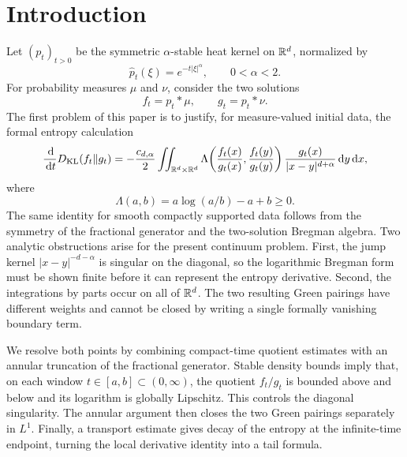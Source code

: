 \section{Introduction}\label{sec:introduction}

Let \((p_t)_{t>0}\) be the symmetric \(\alpha\)-stable heat kernel on
\(\mathbb{R}^d\), normalized by
\[
 \widehat p_t(\xi)=e^{-t|\xi|^\alpha},\qquad 0<\alpha<2.
\]
For probability measures \(\mu\) and \(\nu\), consider the two solutions
\[
 f_t=p_t*\mu,\qquad g_t=p_t*\nu.
\]
The first problem of this paper is to justify, for measure-valued initial
data, the formal entropy calculation
\begin{equation}\label{eq:intro-formal-entropy-derivative}
 \frac{\,\mathrm{d}}{\,\mathrm{d} t}D_{\rm KL}(f_t\|g_t)
 =-\frac{c_{d,\alpha}}2
 \iint_{\mathbb{R}^d\times\mathbb{R}^d}
 \Lambda\!\left(
  \frac{f_t(x)}{g_t(x)},\frac{f_t(y)}{g_t(y)}
 \right)
 \frac{g_t(x)}{|x-y|^{d+\alpha}}\,\mathrm{d} y\,\mathrm{d} x,
\end{equation}
where
\[
 \Lambda(a,b)=a\log(a/b)-a+b\ge0.
\]
The same identity for smooth compactly supported data follows from the
symmetry of the fractional generator and the two-solution Bregman algebra.
Two analytic obstructions arise for the present continuum problem.  First,
the jump kernel \(|x-y|^{-d-\alpha}\) is singular on the diagonal, so the
logarithmic Bregman form must be shown finite before it can represent the
entropy derivative.  Second, the integrations by parts occur on all of
\(\mathbb{R}^d\).  The two resulting Green pairings have different weights and
cannot be closed by writing a single formally vanishing boundary term.

We resolve both points by combining compact-time quotient estimates with an
annular truncation of the fractional generator.  Stable density bounds imply
that, on each window \(t\in[a,b]\subset(0,\infty)\), the quotient
\(f_t/g_t\) is bounded above and below and its logarithm is globally
Lipschitz.  This controls the diagonal singularity.  The annular argument
then closes the two Green pairings separately in \(L^1\).  Finally, a
transport estimate gives decay of the entropy at the infinite-time endpoint,
turning the local derivative identity into a tail formula.

